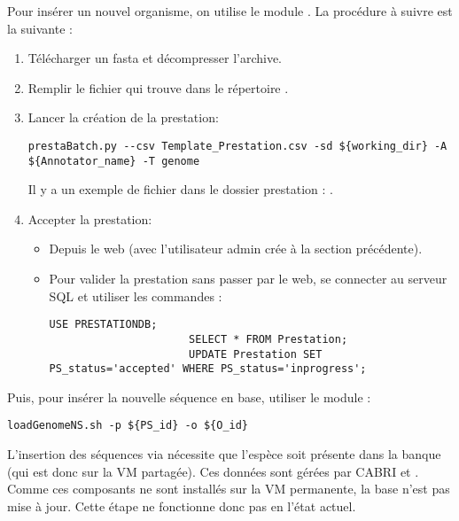 Pour insérer un nouvel organisme, on utilise le module .
La procédure à suivre est la suivante :
\begin{enumerate}
    \item Télécharger un fasta et décompresser l'archive.
    \item Remplir le fichier  qui trouve dans le répertoire .
    \item Lancer la création de la prestation:
          \begin{lstlisting}[style=bash,gobble=14]
              prestaBatch.py --csv Template_Prestation.csv -sd ${working_dir} -A ${Annotator_name} -T genome
          \end{lstlisting}
          Il y a un exemple de fichier  dans le dossier prestation : .
    \item Accepter la prestation:
          \begin{itemize}
              \item Depuis le web (avec l'utilisateur admin crée à la section précédente).
              \item Pour valider la prestation sans passer par le web, se connecter au serveur SQL et utiliser les commandes :
                    \begin{lstlisting}[style=SQL,gobble=22]
                      USE PRESTATIONDB;
                      SELECT * FROM Prestation;
                      UPDATE Prestation SET PS_status='accepted' WHERE PS_status='inprogress';
                  \end{lstlisting}
           \end{itemize}
\end{enumerate}

Puis, pour insérer la nouvelle séquence en base, utiliser le module :
\begin{lstlisting}[style=bash,gobble=4]
    loadGenomeNS.sh -p ${PS_id} -o ${O_id}
\end{lstlisting}

\begin{warningbox}
    L'insertion des séquences via  nécessite que l'espèce soit présente dans la banque  (qui est donc sur la VM partagée).
    Ces données sont gérées par CABRI et .
    Comme ces composants ne sont installés sur la VM permanente, la base  n'est pas mise à jour.
    Cette étape ne fonctionne donc pas en l'état actuel.
\end{warningbox}


